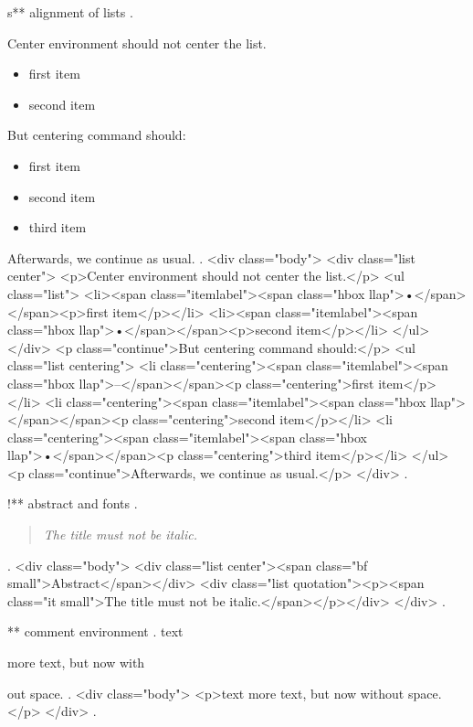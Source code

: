 s** alignment of lists
.
\begin{center}
    Center environment should not center the list.
    \begin{itemize}
        \item first item
        \item second item
    \end{itemize}
\end{center}
But centering command should:
\begin{itemize}
    \centering
    \item[\textendash] first item
    \item[] second item
    \item third item
\end{itemize}
Afterwards, we continue as usual.
.
<div class="body">
<div class="list center">
<p>Center environment should not center the list.</p>
<ul class="list">
<li><span class="itemlabel"><span class="hbox llap">•</span></span><p>ﬁrst item</p></li>
<li><span class="itemlabel"><span class="hbox llap">•</span></span><p>second item</p></li>
</ul>
</div>
<p class="continue">But centering command should:</p>
<ul class="list centering">
<li class="centering"><span class="itemlabel"><span class="hbox llap">–</span></span><p class="centering">ﬁrst item</p></li>
<li class="centering"><span class="itemlabel"><span class="hbox llap"></span></span><p class="centering">second item</p></li>
<li class="centering"><span class="itemlabel"><span class="hbox llap">•</span></span><p class="centering">third item</p></li>
</ul>
<p class="continue">Afterwards, we continue as usual.</p>
</div>
.


!** abstract and fonts
.
\begin{abstract}
\itshape
The title must not be italic.
\end{abstract}
.
<div class="body">
<div class="list center"><span class="bf small">Abstract</span></div>
<div class="list quotation"><p><span class="it small">The title must not be italic.</span></p></div>
</div>
.


** comment environment
.
text
\begin{comment}
    This is a comment.
    \end{comment
    still more comment.
\end{comment}
more text, but now with%
\begin{comment}
    This is a comment.
\end{comment}
out space.
.
<div class="body">
<p>text more text, but now without space.</p>
</div>
.
